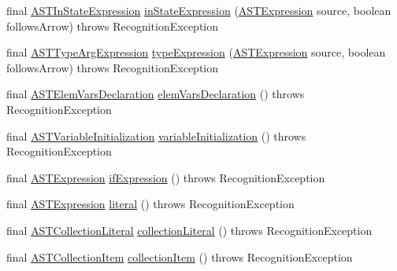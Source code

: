 \begin{DoxyCompactItemize}
final \hyperlink{classorg_1_1tzi_1_1use_1_1parser_1_1ocl_1_1_a_s_t_in_state_expression}{A\-S\-T\-In\-State\-Expression} \hyperlink{classorg_1_1tzi_1_1use_1_1parser_1_1ocl_1_1_o_c_l_parser_acabf1fe464a01f3e2d7d743264f0edf2}{in\-State\-Expression} (\hyperlink{classorg_1_1tzi_1_1use_1_1parser_1_1ocl_1_1_a_s_t_expression}{A\-S\-T\-Expression} source, boolean follows\-Arrow)  throws Recognition\-Exception 
\item 
final \hyperlink{classorg_1_1tzi_1_1use_1_1parser_1_1ocl_1_1_a_s_t_type_arg_expression}{A\-S\-T\-Type\-Arg\-Expression} \hyperlink{classorg_1_1tzi_1_1use_1_1parser_1_1ocl_1_1_o_c_l_parser_a9e56cb613a413cde2bd3f0b33861369e}{type\-Expression} (\hyperlink{classorg_1_1tzi_1_1use_1_1parser_1_1ocl_1_1_a_s_t_expression}{A\-S\-T\-Expression} source, boolean follows\-Arrow)  throws Recognition\-Exception 
\item 
final \hyperlink{classorg_1_1tzi_1_1use_1_1parser_1_1ocl_1_1_a_s_t_elem_vars_declaration}{A\-S\-T\-Elem\-Vars\-Declaration} \hyperlink{classorg_1_1tzi_1_1use_1_1parser_1_1ocl_1_1_o_c_l_parser_a282d58ea0671cdcc5f838a028f2cd29f}{elem\-Vars\-Declaration} ()  throws Recognition\-Exception 
\item 
final \hyperlink{classorg_1_1tzi_1_1use_1_1parser_1_1ocl_1_1_a_s_t_variable_initialization}{A\-S\-T\-Variable\-Initialization} \hyperlink{classorg_1_1tzi_1_1use_1_1parser_1_1ocl_1_1_o_c_l_parser_ae3ca5d327cbe03086affc4a03d404649}{variable\-Initialization} ()  throws Recognition\-Exception 
\item 
final \hyperlink{classorg_1_1tzi_1_1use_1_1parser_1_1ocl_1_1_a_s_t_expression}{A\-S\-T\-Expression} \hyperlink{classorg_1_1tzi_1_1use_1_1parser_1_1ocl_1_1_o_c_l_parser_aedd9ae02c8bb8e197e10658bb6750c0a}{if\-Expression} ()  throws Recognition\-Exception 
\item 
final \hyperlink{classorg_1_1tzi_1_1use_1_1parser_1_1ocl_1_1_a_s_t_expression}{A\-S\-T\-Expression} \hyperlink{classorg_1_1tzi_1_1use_1_1parser_1_1ocl_1_1_o_c_l_parser_aa177245d3ef034e8bb55665057bec4ca}{literal} ()  throws Recognition\-Exception 
\item 
final \hyperlink{classorg_1_1tzi_1_1use_1_1parser_1_1ocl_1_1_a_s_t_collection_literal}{A\-S\-T\-Collection\-Literal} \hyperlink{classorg_1_1tzi_1_1use_1_1parser_1_1ocl_1_1_o_c_l_parser_ae31436b25f9f7a0317d70098eaeafc18}{collection\-Literal} ()  throws Recognition\-Exception 
\item 
final \hyperlink{classorg_1_1tzi_1_1use_1_1parser_1_1ocl_1_1_a_s_t_collection_item}{A\-S\-T\-Collection\-Item} \hyperlink{classorg_1_1tzi_1_1use_1_1parser_1_1ocl_1_1_o_c_l_parser_a0dee11078778326428ca2cea06099660}{collection\-Item} ()  throws Recognition\-Exception 

\end{DoxyCompactItemize}
